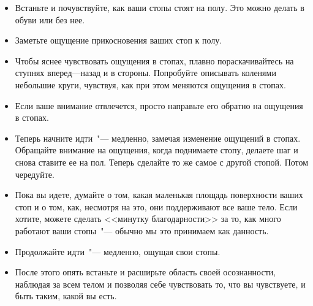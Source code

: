 \begin{itemize}
	\item Встаньте и почувствуйте, как ваши стопы стоят на полу. Это можно делать в обуви или без нее.
	
	\item Заметьте ощущение прикосновения ваших стоп к полу.
	
	\item Чтобы яснее чувствовать ощущения в стопах, плавно пораскачивайтесь на ступнях вперед---назад и в стороны. Попробуйте описывать коленями небольшие круги, чувствуя, как при этом меняются ощущения в стопах.
	
	\item Если ваше внимание отвлечется, просто направьте его обратно на ощущения в стопах.
	
	\item Теперь начните идти~"--- медленно, замечая изменение ощущений в стопах. Обращайте внимание на ощущения, когда поднимаете стопу, делаете шаг и снова ставите ее на пол. Теперь сделайте то же самое с другой стопой. Потом чередуйте.
	
	\item Пока вы идете, думайте о том, какая маленькая площадь поверхности ваших стоп и о том, как, несмотря на это, они поддерживают все ваше тело. Если хотите, можете сделать <<минутку благодарности>> за то, как много работают ваши стопы~"--- обычно мы это принимаем как данность.
	
	\item Продолжайте идти~"--- медленно, ощущая свои стопы.
	\item После этого опять встаньте и расширьте область своей осознанности, наблюдая за всем телом и позволяя себе чувствовать то, что вы чувствуете, и быть таким, какой вы есть.
\end{itemize}

\newpage
{}

